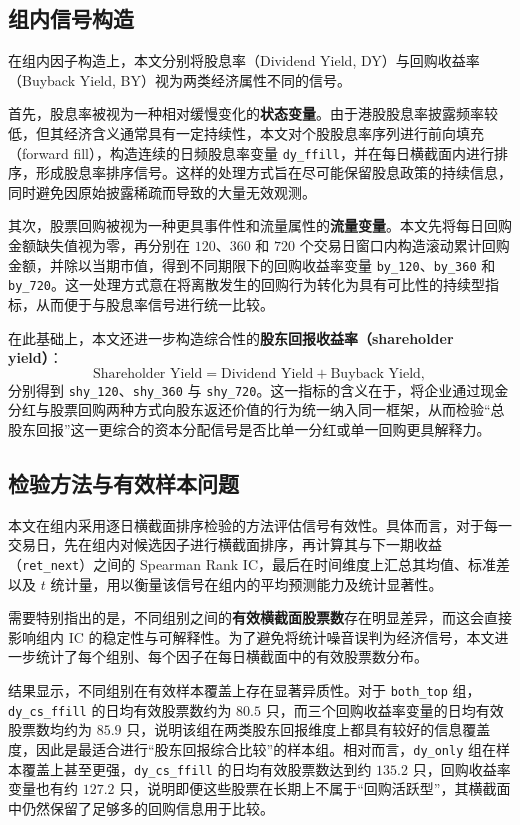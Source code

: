 \documentclass[a4paper,10pt]{article}
\begin{document}
\subsection{组内信号构造}

在组内因子构造上，本文分别将股息率（Dividend Yield, DY）与回购收益率（Buyback Yield, BY）视为两类经济属性不同的信号。

首先，股息率被视为一种相对缓慢变化的\textbf{状态变量}。由于港股股息率披露频率较低，但其经济含义通常具有一定持续性，本文对个股股息率序列进行前向填充（forward fill），构造连续的日频股息率变量 \texttt{dy\_ffill}，并在每日横截面内进行排序，形成股息率排序信号。这样的处理方式旨在尽可能保留股息政策的持续信息，同时避免因原始披露稀疏而导致的大量无效观测。

其次，股票回购被视为一种更具事件性和流量属性的\textbf{流量变量}。本文先将每日回购金额缺失值视为零，再分别在 $120$、$360$ 和 $720$ 个交易日窗口内构造滚动累计回购金额，并除以当期市值，得到不同期限下的回购收益率变量 \texttt{by\_120}、\texttt{by\_360} 和 \texttt{by\_720}。这一处理方式意在将离散发生的回购行为转化为具有可比性的持续型指标，从而便于与股息率信号进行统一比较。

在此基础上，本文还进一步构造综合性的\textbf{股东回报收益率（shareholder yield）}：
\[
\text{Shareholder Yield} = \text{Dividend Yield} + \text{Buyback Yield},
\]
分别得到 \texttt{shy\_120}、\texttt{shy\_360} 与 \texttt{shy\_720}。这一指标的含义在于，将企业通过现金分红与股票回购两种方式向股东返还价值的行为统一纳入同一框架，从而检验“总股东回报”这一更综合的资本分配信号是否比单一分红或单一回购更具解释力。

\subsection{检验方法与有效样本问题}

本文在组内采用逐日横截面排序检验的方法评估信号有效性。具体而言，对于每一交易日，先在组内对候选因子进行横截面排序，再计算其与下一期收益（\texttt{ret\_next}）之间的 Spearman Rank IC，最后在时间维度上汇总其均值、标准差以及 $t$ 统计量，用以衡量该信号在组内的平均预测能力及统计显著性。

需要特别指出的是，不同组别之间的\textbf{有效横截面股票数}存在明显差异，而这会直接影响组内 IC 的稳定性与可解释性。为了避免将统计噪音误判为经济信号，本文进一步统计了每个组别、每个因子在每日横截面中的有效股票数分布。

结果显示，不同组别在有效样本覆盖上存在显著异质性。对于 \texttt{both\_top} 组，\texttt{dy\_cs\_ffill} 的日均有效股票数约为 $80.5$ 只，而三个回购收益率变量的日均有效股票数均约为 $85.9$ 只，说明该组在两类股东回报维度上都具有较好的信息覆盖度，因此是最适合进行“股东回报综合比较”的样本组。相对而言，\texttt{dy\_only} 组在样本覆盖上甚至更强，\texttt{dy\_cs\_ffill} 的日均有效股票数达到约 $135.2$ 只，回购收益率变量也有约 $127.2$ 只，说明即便这些股票在长期上不属于“回购活跃型”，其横截面中仍然保留了足够多的回购信息用于比较。
\end{document}
